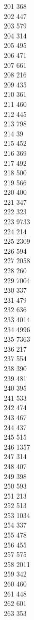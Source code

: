 { 201	368 \\
 202	447 \\
 203	579 \\
 204	314 \\
 205	495 \\
 206	471 \\
 207	661 \\
 208	216 \\
 209	435 \\
 210	361 \\
 211	460 \\
 212	445 \\
 213	798 \\
 214	39 \\
 215	452 \\
 216	369 \\
 217	492 \\
 218	500 \\
 219	566 \\
 220	400 \\
 221	347 \\
 222	323 \\
 223	9733 \\
 224	214 \\
 225	2309 \\
 226	594 \\
 227	2058 \\
 228	260 \\
 229	7004 \\
 230	337 \\
 231	479 \\
 232	636 \\
 233	4014 \\
 234	4996 \\
 235	7363 \\
 236	217 \\
 237	554 \\
 238	390 \\
 239	481 \\
 240	395 \\
 241	533 \\
 242	474 \\
 243	467 \\
 244	437 \\
 245	515 \\
 246	1357 \\
 247	314 \\
 248	407 \\
 249	398 \\
 250	593 \\
 251	213 \\
 252	513 \\
 253	1034 \\
 254	337 \\
 255	478 \\
 256	455 \\
 257	575 \\
 258	2011 \\
 259	342 \\
 260	460 \\
 261	448 \\
 262	601 \\
 263	353 \\
}
